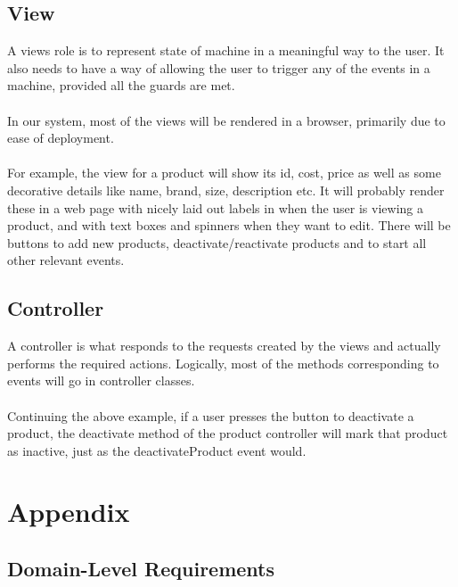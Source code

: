 \documentclass[a4paper]{article}
\begin{document}
\subsection{View}
A views role is to represent state of machine in a meaningful way to the user. It also needs to have a way of allowing the user to trigger any of the events in a machine, provided all the guards are met.
\\\\
In our system, most of the views will be rendered in a browser, primarily due to ease of deployment.
\\\\
For example, the view for a product will show its id, cost, price as well as some decorative details like name, brand, size, description etc. It will probably render these in a web page with nicely laid out labels in when the user is viewing a product, and with text boxes and spinners when they want to edit. There will be buttons to add new products, deactivate/reactivate products and to start all other relevant events.

\subsection{Controller}
A controller is what responds to the requests created by the views and actually performs the required actions. Logically, most of the methods corresponding to events will go in controller classes. 
\\\\
Continuing the above example, if a user presses the button to deactivate a product, the deactivate method of the product controller will mark that product as inactive, just as the deactivateProduct event would.
\pagebreak

\section{Appendix}

\subsection{Domain-Level Requirements}
\end{document}
